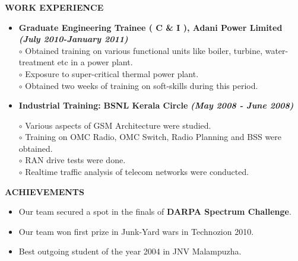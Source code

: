 \documentclass[a4paper,10pt]{article}
\begin{document}
{\qquad \\ \\ \\ \\ \\ \\ \\ \\ \\ \\}

 \colorbox{titleColor}{\parbox{6.5in}{\textbf{WORK EXPERIENCE}}}

 \begin{itemize}
 \setlength{\itemsep}{1pt}
 \item \textbf{Graduate Engineering Trainee ( C \& I ), Adani Power Limited}  \textbf \emph{(July 2010-January 2011)}\\ 
 $\circ$ Obtained training on various functional units like boiler, turbine, water-treatment etc in a power plant.\\
 $\circ$ Exposure to super-critical thermal power plant. \\
 $\circ$ Obtained two weeks of training on soft-skills during this period.
 
   \item \textbf{Industrial Training:} \textbf{BSNL Kerala Circle}  \textbf \emph{(May 2008 - June 2008)}        

  $\circ$ Various aspects of GSM Architecture were studied. \\
  $\circ$ Training on OMC Radio, OMC Switch, Radio Planning and BSS were obtained. \\
  $\circ$ RAN drive tests were done. \\
  $\circ$ Realtime traffic analysis of telecom networks were conducted.

\end{itemize}

 \colorbox{titleColor}{\parbox{6.5in}{\textbf{ACHIEVEMENTS}}}

 \begin{itemize}
  \item Our team secured a spot in the finals of \textbf{DARPA Spectrum Challenge}.
  \item Our team won first prize in Junk-Yard wars in Technozion 2010.
  \item Best outgoing student of the year 2004 in JNV Malampuzha.
  \end{itemize}
  
\end{document}
